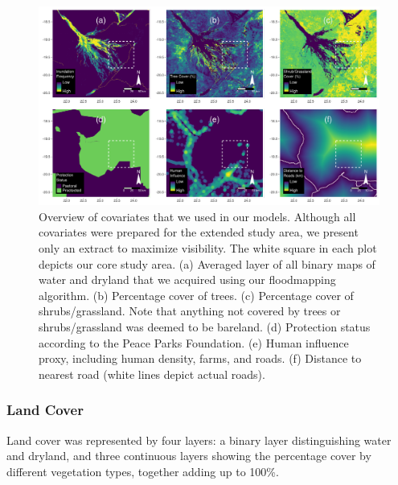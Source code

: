 \documentclass[abstract=on,10pt,a4paper,bibliography=totocnumbered]{scrartcl}
\begin{document}
\begin{figure}[h]
  \begin{center}
    \includegraphics[width = \textwidth]{99_Covariates.pdf}
    \caption{Overview of covariates that we used in our models. Although all
    covariates were prepared for the extended study area, we present only an
    extract to maximize visibility. The white square in each plot depicts our
    core study area. (a) Averaged layer of all binary maps of water and dryland
    that we acquired using our floodmapping algorithm. (b) Percentage cover of
    trees. (c) Percentage cover of shrubs/grassland. Note that anything not
    covered by trees or shrubs/grassland was deemed to be bareland. (d)
    Protection status according to the Peace Parks Foundation. (e) Human
    influence proxy, including human density, farms, and roads. (f) Distance to
    nearest road (white lines depict actual roads).}
    \label{Covariates}
  \end{center}
\end{figure}

\newpage
\subsubsection{Land Cover}
Land cover was represented by four layers: a binary layer distinguishing water
and dryland, and three continuous layers showing the percentage cover by
different vegetation types, together adding up to 100\%.
\end{document}
